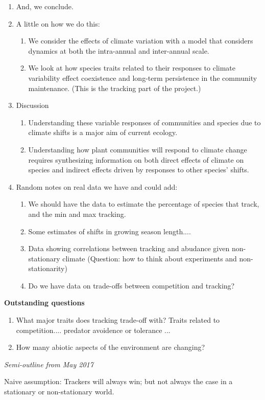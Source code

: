 \documentclass[11pt,letterpaper]{article}
\renewcommand{\subsection}[1]{%
\bigskip
\begin{center}
\begin{large}
\normalfont\itshape #1
\end{large}
\end{center}}
\begin{document}
\begin{enumerate}
\item And, we conclude.
\item A little on how we do this:
\begin{enumerate}
\item We consider the effects of climate variation with a model that considers dynamics at both the
intra-annual and inter-annual scale. 
\item We look at how species traits related to their responses to
  climate variability effect coexistence and long-term persistence in the community
  maintenance. (This is the tracking part of the project.) 
\end{enumerate}
\item Discussion 
\begin{enumerate}
\item Understanding these variable responses of communities and species
  due to climate shifts is a major aim of current ecology.
\item Understanding how plant communities will respond to climate change
requires synthesizing information on both direct effects of climate on species
and indirect effects driven by responses to other species'
shifts. 
\end{enumerate}
\item Random notes on real data we have and could add:
\begin{enumerate}
\item We should have the data to estimate the
percentage of species that track, and the min and max tracking.
\item Some estimates of shifts in growing season length....
\item Data showing correlations between tracking and abudance given non-stationary climate (Question: how to think about experiments and non-stationarity)
\item Do we have data on trade-offs between competition and tracking? 
\end{enumerate}
\end{enumerate}

{\bf Outstanding questions}
\begin{enumerate}
\item What major traits does tracking trade-off with? Traits related to competition.... predator avoidence or tolerance ...
\item How many abiotic aspects of the environment are changing?
\end{enumerate}


\subsection{Semi-outline from May 2017} Naive assumption: Trackers will always win; but not always the case in a stationary or non-stationary world. 
\end{document}
